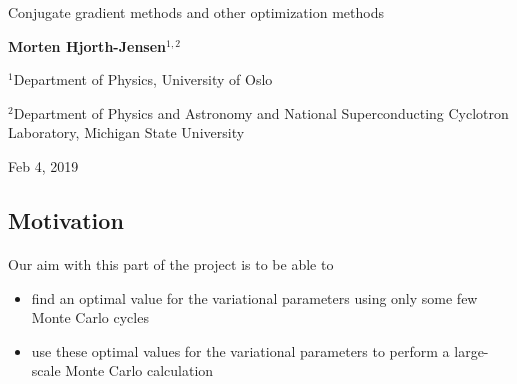 \documentclass[%
oneside,                 %
final,                   %
10pt]{article}
\begin{document}

\newcommand{\exercisesection}[1]{\subsection*{#1}}







\thispagestyle{empty}

\begin{center}
{\LARGE\bf
\begin{spacing}{1.25}
Conjugate gradient methods and other optimization methods
\end{spacing}
}
\end{center}


\begin{center}
{\bf Morten Hjorth-Jensen${}^{1, 2}$} \\ [0mm]
\end{center}

\begin{center}
\centerline{{\small ${}^1$Department of Physics, University of Oslo}}
\centerline{{\small ${}^2$Department of Physics and Astronomy and National Superconducting Cyclotron Laboratory, Michigan State University}}
\end{center}
    

\begin{center}
Feb 4, 2019
\end{center}

\vspace{1cm}


\subsection*{Motivation}

\paragraph{}
Our aim with this part of the project is to be able to
\begin{itemize}
\item find an optimal value for the variational parameters using only some few Monte Carlo cycles

\item use these optimal values for the variational parameters to perform a large-scale Monte Carlo calculation
\end{itemize}
\end{document}
